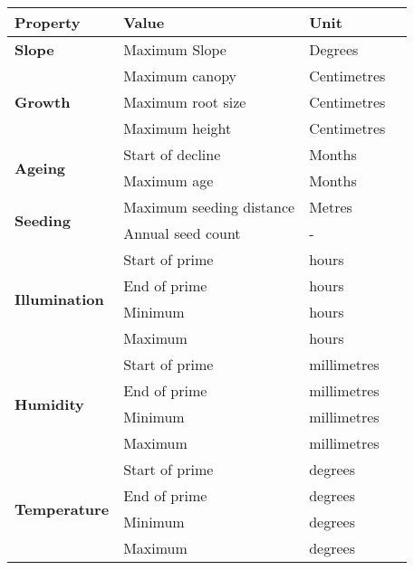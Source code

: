 \begin{table}[]
  \centering
	    \begin{tabular}{|p{4cm}|p{7cm}|p{2cm}|p{0cm}|}
		\hline	
		\textbf{Property} & \textbf{Value} & \textbf{Unit} \\
		\hline
		\textbf{Slope} & Maximum Slope & Degrees \\
		\hline
		\multirow{3}{*}{\textbf{Growth}} & \multicolumn{1}{l|}{Maximum canopy} & \multicolumn{1}{l|}{Centimetres} \\\cline{2-3}
        						   & \multicolumn{1}{l|}{Maximum root size} & \multicolumn{1}{l|}{Centimetres} \\\cline{2-3}
                               & \multicolumn{1}{l|}{Maximum height} & \multicolumn{1}{l|}{Centimetres} \\
		\hline
		\multirow{2}{*}{\textbf{Ageing}} & \multicolumn{1}{l|}{Start of decline} & \multicolumn{1}{l|}{Months} \\\cline{2-3}
        						   & \multicolumn{1}{l|}{Maximum age} & \multicolumn{1}{l|}{Months} \\
		\hline    
		\multirow{2}{*}{\textbf{Seeding}} & \multicolumn{1}{l|}{Maximum seeding distance} & \multicolumn{1}{l|}{Metres} \\\cline{2-3}
        						   & \multicolumn{1}{l|}{Annual seed count} & \multicolumn{1}{l|}{ - } \\
		\hline    
		\multirow{4}{*}{\textbf{Illumination}}
								& \multicolumn{1}{l|}{Start of prime} & \multicolumn{1}{l|}{hours} \\\cline{2-3}
								& \multicolumn{1}{l|}{End of prime} & \multicolumn{1}{l|}{hours} \\\cline{2-3}
								& \multicolumn{1}{l|}{Minimum} & \multicolumn{1}{l|}{hours} \\\cline{2-3}
								& \multicolumn{1}{l|}{Maximum} & \multicolumn{1}{l|}{hours} \\
		\hline   
		\multirow{4}{*}{\textbf{Humidity}}
								& \multicolumn{1}{l|}{Start of prime} & \multicolumn{1}{l|}{millimetres} \\\cline{2-3}
								& \multicolumn{1}{l|}{End of prime} & \multicolumn{1}{l|}{millimetres} \\\cline{2-3}
								& \multicolumn{1}{l|}{Minimum} & \multicolumn{1}{l|}{millimetres} \\\cline{2-3}
								& \multicolumn{1}{l|}{Maximum} & \multicolumn{1}{l|}{millimetres} \\
		\hline    
		\multirow{4}{*}{\textbf{Temperature}}
								& \multicolumn{1}{l|}{Start of prime} & \multicolumn{1}{l|}{degrees} \\\cline{2-3}
								& \multicolumn{1}{l|}{End of prime} & \multicolumn{1}{l|}{degrees} \\\cline{2-3}
								& \multicolumn{1}{l|}{Minimum} & \multicolumn{1}{l|}{degrees} \\\cline{2-3}
								& \multicolumn{1}{l|}{Maximum} & \multicolumn{1}{l|}{degrees} \\
		\hline                                                                           
		\end{tabular}
	\label{tab:specie_properties}	
\end{table}

